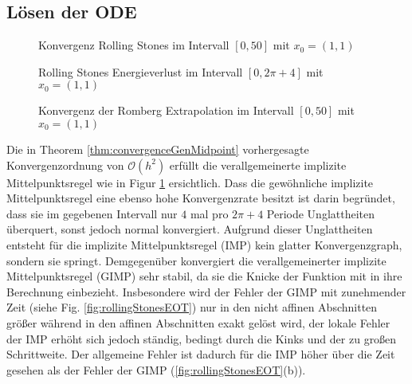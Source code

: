 \subsection{Lösen der ODE}
\begin{figure}
\centering

\caption{Konvergenz Rolling Stones im Intervall $[0,50]$ mit $x_0=(1,1)$}
\label{fig:rollingStonesConvergence}
\end{figure}


\begin{figure}[H]
\footnotesize 
\centering
\begin{minipage}[b]{0.45\linewidth}

\caption{Rolling Stones Energieverlust im Intervall $[0,2\pi+4]$ mit $x_0=(1,1)$}
\label{fig:rollingStonesEnergyError}
\end{minipage}
\quad
\begin{minipage}[b]{0.45\linewidth}

\caption{Konvergenz der Romberg Extrapolation im Intervall $[0,50]$ mit $x_0=(1,1)$}
\label{fig:rollingStonesConvergenceRomberg}
\end{minipage}

\end{figure}


Die in Theorem \ref{thm:convergenceGenMidpoint} vorhergesagte Konvergenzordnung von $\mathcal O(h^2)$ erfüllt die verallgemeinerte implizite Mittelpunktsregel wie in Figur \ref{fig:rollingStonesConvergence} ersichtlich.
Dass die gewöhnliche implizite Mittelpunktsregel eine ebenso hohe Konvergenzrate besitzt ist darin begründet, dass sie im gegebenen Intervall nur $4$ mal pro $2\pi+4$ Periode Unglattheiten überquert, sonst jedoch normal konvergiert. Aufgrund dieser Unglattheiten entsteht für die implizite Mittelpunktsregel (IMP) kein glatter Konvergenzgraph, sondern sie springt. Demgegenüber konvergiert die verallgemeinerter implizite Mittelpunktsregel (GIMP) sehr stabil, da sie die Knicke der Funktion mit in ihre Berechnung einbezieht.
Insbesondere wird der Fehler der GIMP mit zunehmender Zeit (siehe Fig. \ref{fig:rollingStonesEOT}) nur in den nicht affinen Abschnitten größer während in den affinen Abschnitten exakt gelöst wird, der lokale Fehler der IMP erhöht sich jedoch ständig, bedingt durch die Kinks und der zu großen Schrittweite. Der allgemeine Fehler ist dadurch für die IMP höher über die Zeit gesehen als der Fehler der GIMP (\ref{fig:rollingStonesEOT}(b)).

